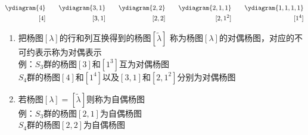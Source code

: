 \begin{example}[$S_4$ 群的杨图从大到小排列为]
	\begin{equation}\begin{aligned}
	\ydiagram{4}&\quad&\ydiagram{3,1}&\quad&\ydiagram{2,2}&\quad&\ydiagram{2,1,1}&\quad&\ydiagram{1,1,1,1}\\
	[4]&\quad&[3,1]&\quad&[2,2]&\quad&[2,1^2]&\quad&[1^4]
	\end{aligned}\end{equation}
\end{example}


\begin{note}
	\begin{enumerate}
		\item 
		把杨图$[\lambda]$的行和列互换得到的杨图$[\tilde{\lambda}]$
		称为杨图$[\lambda]$的{\color{seco}对偶杨图}，对应的不可约表示称为对偶表示\\
		例：$S_3$群的杨图$[3]$和$[1^3]$互为对偶杨图\\
		\phantom{例：}$S_4$群的杨图$[4]$和$[1^4]$以及$[3,1]$和$[2,1^2]$分别为对偶杨图
		\item 
		若杨图$[\lambda]=[\tilde{\lambda}]$则称为自偶杨图\\
		例：$S_3$群的杨图$[2,1]$为自偶杨图\\
		\phantom{例：}$S_4$群的杨图$[2,2]$为自偶杨图
	\end{enumerate}
\end{note}



